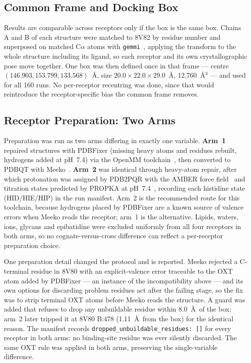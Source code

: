 \documentclass[sigconf]{acmart}
\begin{document}
\subsection{Common Frame and Docking Box}

Results are comparable across receptors only if the box is the same box. Chains A
and B of each structure were matched to 8V82 by residue number and superposed on
matched C$\alpha$ atoms with \texttt{gemmi}~\cite{wojdyr2022}, applying the
transform to the whole structure including its ligand, so each receptor and its
own crystallographic pose move together. One box was then defined once in that
frame --- centre $(146.903,\allowbreak 153.799,\allowbreak 133.568)$~\AA, size
$20.0 \times 22.0 \times 29.0$~\AA, 12{,}760~\AA$^3$ --- and used for all 160
runs. No per-receptor
recentring was done, since that would reintroduce the receptor-specific bias the
common frame removes.

\subsection{Receptor Preparation: Two Arms}

Preparation was run as two arms differing in exactly one variable.
\textbf{Arm~1} repaired structures with PDBFixer (missing heavy atoms and residues
rebuilt, hydrogens added at pH~7.4) via the OpenMM toolchain~\cite{eastman2017},
then converted to PDBQT with Meeko~\cite{meeko}. \textbf{Arm~2} was identical
through heavy-atom repair, after which protonation was assigned by PDB2PQR with
the AMBER force field~\cite{dolinsky2007} and titration states predicted by PROPKA
at pH~7.4~\cite{olsson2011}, recording each histidine state (HID/HIE/HIP) in the
run manifest. Arm~2 is the recommended route for this toolchain, because hydrogens
placed by PDBFixer are a known source of valence errors when Meeko reads the
receptor; arm~1 is the alternative. Lipids, waters, ions, glycans and epibatidine
were excluded uniformly from all four receptors in both arms, so no
cognate-versus-cross difference can reflect a per-receptor preparation choice.

One preparation detail changed the protocol and is reported. Meeko rejected a
C-terminal residue in 8V80 with an explicit-valence error traceable to the OXT
atom added by PDBFixer --- an instance of the incompatibility above --- and its
own options for discarding problem residues act after the failing stage, so the
fix was to strip terminal OXT atoms before Meeko reads the structure. A guard was
added that refuses to drop any unbuildable residue within 8.0~\AA\ of the box;
arm~2 later tripped it at 8V80 B:478 (1.11~\AA\ from the box) for the identical
reason. The manifest records \texttt{dropped\_unbuildable\_residues: []} for every
receptor in both arms: no binding-site residue was ever silently discarded. The
same OXT rule was applied in both arms, preserving the single-variable difference.
\end{document}
